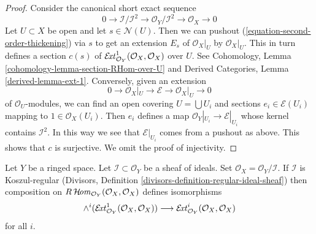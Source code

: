 \begin{proof}
Consider the canonical short exact sequence
\begin{equation}
\label{equation-second-order-thickening}
0 \to \mathcal{I}/\mathcal{I}^2 \to \mathcal{O}_Y/\mathcal{I}^2 \to
\mathcal{O}_X \to 0
\end{equation}
Let $U \subset X$ be open and let $s \in \mathcal{N}(U)$. Then we can
pushout (\ref{equation-second-order-thickening}) via $s$ to
get an extension $E_s$ of $\mathcal{O}_X|_U$ by $\mathcal{O}_X|_U$.
This in turn defines a section $c(s)$ of
$\mathop{\mathcal{E}\!\mathit{xt}}\nolimits^1_{\mathcal{O}_Y}(\mathcal{O}_X, \mathcal{O}_X)$
over $U$.
See Cohomology, Lemma \ref{cohomology-lemma-section-RHom-over-U}
and Derived Categories, Lemma \ref{derived-lemma-ext-1}.
Conversely, given an extension
$$
0 \to \mathcal{O}_X|_U \to \mathcal{E} \to \mathcal{O}_X|_U \to 0
$$
of $\mathcal{O}_U$-modules, we can find an open covering
$U = \bigcup U_i$ and sections $e_i \in \mathcal{E}(U_i)$
mapping to $1 \in \mathcal{O}_X(U_i)$. Then $e_i$ defines a map
$\mathcal{O}_Y|_{U_i} \to \mathcal{E}|_{U_i}$ whose kernel
contains $\mathcal{I}^2$. In this way we see that
$\mathcal{E}|_{U_i}$ comes from a pushout as above.
This shows that $c$ is surjective. We omit the proof
of injectivity.
\end{proof}

\begin{lemma}
\label{lemma-regular-ideal-ext}
Let $Y$ be a ringed space. Let $\mathcal{I} \subset \mathcal{O}_Y$
be a sheaf of ideals. Set $\mathcal{O}_X = \mathcal{O}_Y/\mathcal{I}$.
If $\mathcal{I}$ is Koszul-regular
(Divisors, Definition \ref{divisors-definition-regular-ideal-sheaf})
then composition on $R\mathop{\mathcal{H}\!\mathit{om}}\nolimits_{\mathcal{O}_Y}(\mathcal{O}_X, \mathcal{O}_X)$
defines isomorphisms
$$
\wedge^i(\mathop{\mathcal{E}\!\mathit{xt}}\nolimits^1_{\mathcal{O}_Y}(\mathcal{O}_X, \mathcal{O}_X))
\longrightarrow
\mathop{\mathcal{E}\!\mathit{xt}}\nolimits^i_{\mathcal{O}_Y}(\mathcal{O}_X, \mathcal{O}_X)
$$
for all $i$.
\end{lemma}

